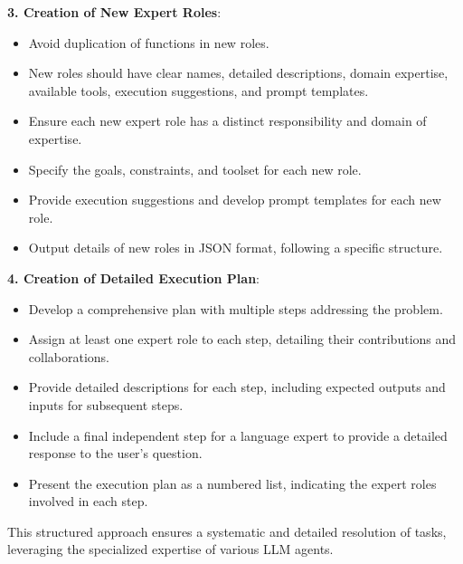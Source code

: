 \textbf{3. Creation of New Expert Roles}:
\begin{itemize}
\item Avoid duplication of functions in new roles.
\item New roles should have clear names, detailed descriptions, domain expertise, available tools, execution suggestions, and prompt templates.
\item Ensure each new expert role has a distinct responsibility and domain of expertise.
\item Specify the goals, constraints, and toolset for each new role.
\item Provide execution suggestions and develop prompt templates for each new role.
\item Output details of new roles in JSON format, following a specific structure.
\end{itemize}

\textbf{4. Creation of Detailed Execution Plan}:
\begin{itemize}
\item Develop a comprehensive plan with multiple steps addressing the problem.
\item Assign at least one expert role to each step, detailing their contributions and collaborations.
\item Provide detailed descriptions for each step, including expected outputs and inputs for subsequent steps.
\item Include a final independent step for a language expert to provide a detailed response to the user's question.
\item Present the execution plan as a numbered list, indicating the expert roles involved in each step.
\end{itemize}

This structured approach ensures a systematic and detailed resolution of tasks, leveraging the specialized expertise of various LLM agents.

